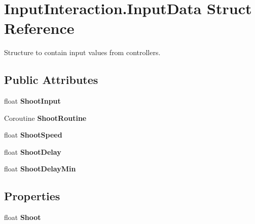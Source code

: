\hypertarget{struct_input_interaction_1_1_input_data}{\section{Input\-Interaction.\-Input\-Data Struct Reference}
\label{struct_input_interaction_1_1_input_data}
}


Structure to contain input values from controllers.  


\subsection*{Public Attributes}
\begin{DoxyCompactItemize}
\item 
\hypertarget{struct_input_interaction_1_1_input_data_a382b1edf1a4d29c5350a49e6d7ead076}{float {\bfseries Shoot\-Input}}\label{struct_input_interaction_1_1_input_data_a382b1edf1a4d29c5350a49e6d7ead076}

\item 
\hypertarget{struct_input_interaction_1_1_input_data_a506d4a08f28724c26560021d3804db4b}{Coroutine {\bfseries Shoot\-Routine}}\label{struct_input_interaction_1_1_input_data_a506d4a08f28724c26560021d3804db4b}

\item 
\hypertarget{struct_input_interaction_1_1_input_data_a33604ebf12d7a682b19153dd0d2bea4b}{float {\bfseries Shoot\-Speed}}\label{struct_input_interaction_1_1_input_data_a33604ebf12d7a682b19153dd0d2bea4b}

\item 
\hypertarget{struct_input_interaction_1_1_input_data_a5fe52ef299f6a43d7589c13207b91ac9}{float {\bfseries Shoot\-Delay}}\label{struct_input_interaction_1_1_input_data_a5fe52ef299f6a43d7589c13207b91ac9}

\item 
\hypertarget{struct_input_interaction_1_1_input_data_a42dfc16b290dc2d44fad6c6472bd3ea5}{float {\bfseries Shoot\-Delay\-Min}}\label{struct_input_interaction_1_1_input_data_a42dfc16b290dc2d44fad6c6472bd3ea5}

\end{DoxyCompactItemize}
\subsection*{Properties}
\begin{DoxyCompactItemize}
\item 
\hypertarget{struct_input_interaction_1_1_input_data_a27de8f9aa435f9f222b1041fa26408a5}{float {\bfseries Shoot}}\label{struct_input_interaction_1_1_input_data_a27de8f9aa435f9f222b1041fa26408a5}

\end{DoxyCompactItemize}


